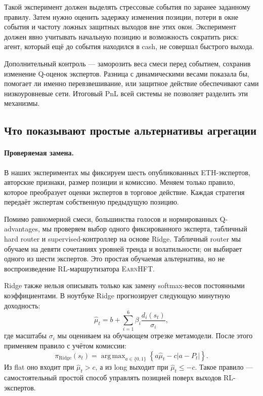 \documentclass[9pt,a4paper,twocolumn]{extarticle}
\newcommand{\Earn}{\textsc{EarnHFT}}
\DeclareMathOperator*{\argmax}{arg\,max}
\begin{document}
Такой эксперимент должен выделять стрессовые события по заранее заданному правилу. Затем нужно
оценить задержку изменения позиции, потери в окне события и частоту ложных защитных выходов вне
этих окон. Эксперимент должен явно учитывать начальную позицию и возможность сократить риск:
агент, который ещё до события находился в cash, не совершал быстрого выхода.

Дополнительный контроль --- заморозить веса смеси перед событием, сохранив изменение Q-оценок
экспертов. Разница с динамическими весами показала бы, помогает ли именно перевзвешивание, или
защитное действие обеспечивают сами низкоуровневые сети. Итоговый PnL всей системы не позволяет
разделить эти механизмы.

\subsection{Что показывают простые альтернативы агрегации}
\label{sec:aggregation_experiments}

\paragraph{Проверяемая замена.}

В наших экспериментах мы фиксируем шесть опубликованных ETH-экспертов, авторские признаки,
размер позиции и комиссию. Меняем только правило, которое преобразует оценки экспертов в
торговое действие. Каждая стратегия передаёт экспертам собственную предыдущую позицию.

Помимо равномерной смеси, большинства голосов и нормированных Q-advantages, мы проверяем выбор
одного фиксированного эксперта, табличный hard router и supervised-контроллер на основе Ridge.
Табличный router мы обучаем на девяти сочетаниях уровней тренда и волатильности; он выбирает
одного из шести экспертов. Это простая обучаемая альтернатива, но не воспроизведение
RL-маршрутизатора \Earn{}.

Ridge также нельзя описывать только как замену softmax-весов постоянными коэффициентами. В
ноутбуке Ridge прогнозирует следующую минутную доходность:
\begin{equation}
  \widehat{\mu}_t
  =
  b+\sum_{i=1}^{6}
  \beta_i\frac{d_i(s_t)}{\sigma_i},
  \label{eq:ridge_forecast}
\end{equation}
где масштабы $\sigma_i$ мы оцениваем на обучающем отрезке метамодели. После этого применяем
правило с учётом комиссии:
\begin{equation}
  \pi_{\mathrm{Ridge}}(s_t)
  =
  \argmax_{a\in\{0,1\}}
  \left\{
    a\widehat{\mu}_t
    -c|a-P_t|
  \right\}.
  \label{eq:ridge_policy}
\end{equation}
Из flat оно входит при $\widehat{\mu}_t>c$, а из long выходит при $\widehat{\mu}_t\leq-c$. Такое
правило --- самостоятельный простой способ управлять позицией поверх выходов RL-экспертов.
\end{document}
